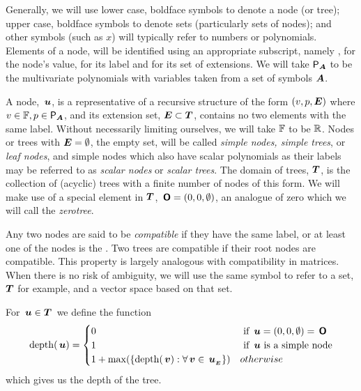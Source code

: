 Generally, we will use lower case, boldface symbols to denote a node
(or tree); upper case, boldface symbols to denote sets
(particularly sets of nodes); and other symbols (such as \(x\)) will
typically refer to numbers or \polyrat polynomials. Elements of a node,
 will be identified using an appropriate subscript, namely
, for the node's value,  for its label and 
for its set of extensions.  We will take $\mathsf{P}_{\boldsymbol{A}}$ to be the \polytype
multivariate polynomials with variables taken from a set of symbols
$\boldsymbol{A}$.

\begin{definition}
A node, $\,\boldsymbol{u}$, is a representative of a recursive structure of
the form $(v, p, \boldsymbol{E})$ where $v \in \mathbb{F}, p \in \mathsf{P}_{\boldsymbol{A}}$, and
its extension set, $\boldsymbol{E} \subset \boldsymbol{T}$, contains no two elements
with the same label. Without necessarily limiting ourselves, we will
take $\mathbb{F}$ to be $\mathbb{R}$.  Nodes or trees with \(\boldsymbol{E} =
\emptyset\), the empty set, will be called \emph{simple nodes, simple
  trees}, or \emph{leaf nodes}, and simple nodes which also have
scalar polynomials as their labels may be referred to as \emph{scalar
  nodes} or \emph{scalar trees}. The domain of trees, $\boldsymbol{T}$, is the
collection of (acyclic) trees with a finite number of nodes of this
form.
We will make use of a special element in $\boldsymbol{T}$, $\,\boldsymbol{\mathsf{O}} = (0, 0,
\emptyset)$, an analogue of zero which we will call the
\emph{zerotree}.


\end{definition}


Any two nodes are said to be \emph{compatible} if they have the same
label, or at least one of the nodes is the \tzerotree. Two trees are
compatible if their root nodes are compatible.   This property is largely analogous with
compatibility in matrices.  When there is no risk
of ambiguity, we will use the same symbol to refer to a set, $\boldsymbol{T}$
for example, and a vector space based on that set.

\begin{definition}
  For \(\,\boldsymbol{u} \in \boldsymbol{T}\)\ we define the function
  \begin{align*}
      \operatorname{depth}(\,\boldsymbol{u}) = \begin{cases}
        0 & \text{ if } \,\boldsymbol{u} = (0,0,\emptyset) = \,\boldsymbol{\mathsf{O}} \\
        1 & \text{ if } \,\boldsymbol{u} \text{ is a simple node} \\
        1 + \max(\lbrace\operatorname{depth}(\,\boldsymbol{v}):\forall \,\boldsymbol{v} \in {\,\boldsymbol{u}}_{{}_{\boldsymbol{E}}}\rbrace) & otherwise
      \end{cases}
  \end{align*}
  which gives us the depth of the tree.
\end{definition}


